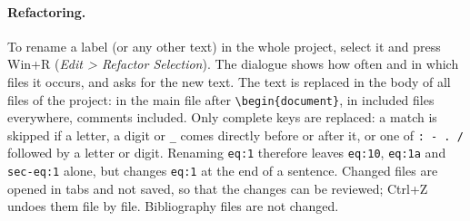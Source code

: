 \documentclass[11pt]{article}
\newcommand{\key}[1]{\textsf{#1}}
\newcommand{\menu}[1]{\textsf{\textit{#1}}}
\begin{document}
    \paragraph{Refactoring.}     To rename a label (or any other text) in the whole project, select it and press \key{Win+R} (\menu{Edit > Refactor Selection}). The dialogue shows how often and in which files it occurs, and asks for the new text. The text is replaced in the body of all files of the project: in the main file after \verb+\begin{document}+, in included files everywhere, comments included. Only complete keys are replaced: a match is skipped if a letter, a digit or \verb+_+ comes directly before or after it, or one of \verb+: - . /+ followed by a letter or digit. Renaming \verb+eq:1+ therefore leaves \verb+eq:10+, \verb+eq:1a+ and \verb+sec-eq:1+ alone, but changes \verb+eq:1+ at the end of a sentence. Changed files are opened in tabs and not saved, so that the changes can be reviewed; \key{Ctrl+Z} undoes them file by file. Bibliography files are not changed.
\end{document}
